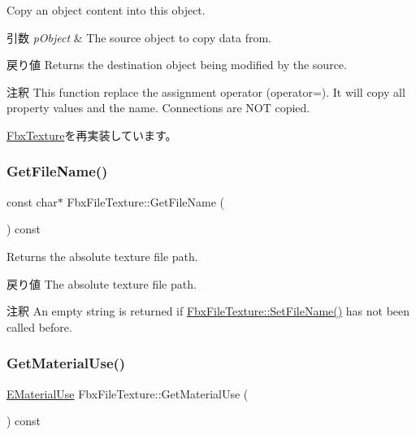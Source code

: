 Copy an object content into this object. 
\begin{DoxyParams}{引数}
{\em p\+Object} & The source object to copy data from. \\
\hline
\end{DoxyParams}
\begin{DoxyReturn}{戻り値}
Returns the destination object being modified by the source. 
\end{DoxyReturn}
\begin{DoxyRemark}{注釈}
This function replace the assignment operator (operator=). It will copy all property values and the name. Connections are N\+OT copied. 
\end{DoxyRemark}


\hyperlink{class_fbx_texture_a321c23c2dc2e91c58e2fcc2ed7d29f9e}{Fbx\+Texture}を再実装しています。

\mbox{\label{class_fbx_file_texture_ae8b7a59e5d2787e9ca1aa4f3f1d2c7cf}} 
\subsubsection{\texorpdfstring{Get\+File\+Name()}{GetFileName()}}
{\footnotesize\ttfamily const char$\ast$ Fbx\+File\+Texture\+::\+Get\+File\+Name (\begin{DoxyParamCaption}{ }\end{DoxyParamCaption}) const}

Returns the absolute texture file path. \begin{DoxyReturn}{戻り値}
The absolute texture file path. 
\end{DoxyReturn}
\begin{DoxyRemark}{注釈}
An empty string is returned if \hyperlink{class_fbx_file_texture_a82e450fd46559fc4c78ca6f0d593b837}{Fbx\+File\+Texture\+::\+Set\+File\+Name()} has not been called before. 
\end{DoxyRemark}
\mbox{\label{class_fbx_file_texture_a5eee84efb4b82ad7270ac95a7ca9a5ca}} 
\subsubsection{\texorpdfstring{Get\+Material\+Use()}{GetMaterialUse()}}
{\footnotesize\ttfamily \hyperlink{class_fbx_file_texture_ae85eb429015d450d8cb8a753634c0d1e}{E\+Material\+Use} Fbx\+File\+Texture\+::\+Get\+Material\+Use (\begin{DoxyParamCaption}{ }\end{DoxyParamCaption}) const}

